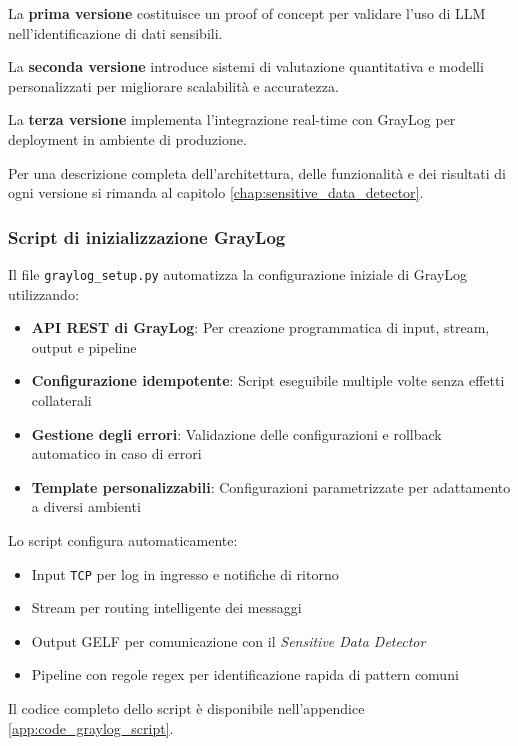 \documentclass[12pt]{report}
\begin{document}
La \textbf{prima versione} costituisce un proof of concept per validare l'uso di LLM nell'identificazione di dati sensibili.

La \textbf{seconda versione} introduce sistemi di valutazione quantitativa e modelli personalizzati per migliorare scalabilità e accuratezza.

La \textbf{terza versione} implementa l'integrazione real-time con GrayLog per deployment in ambiente di produzione.

Per una descrizione completa dell'architettura, delle funzionalità e dei risultati di ogni versione si rimanda al capitolo \ref{chap:sensitive_data_detector}.

\subsubsection{Script di inizializzazione GrayLog}
Il file \texttt{graylog\_setup.py} automatizza la configurazione iniziale di GrayLog utilizzando:

\begin{itemize}
    \item \textbf{API REST di GrayLog}: Per creazione programmatica di input, stream, output e pipeline
    \item \textbf{Configurazione idempotente}: Script eseguibile multiple volte senza effetti collaterali
    \item \textbf{Gestione degli errori}: Validazione delle configurazioni e rollback automatico in caso di errori
    \item \textbf{Template personalizzabili}: Configurazioni parametrizzate per adattamento a diversi ambienti
\end{itemize}

Lo script configura automaticamente:
\begin{itemize}
    \item Input \texttt{TCP} per log in ingresso e notifiche di ritorno
    \item Stream per routing intelligente dei messaggi
    \item Output GELF per comunicazione con il \textit{Sensitive Data Detector}
    \item Pipeline con regole regex per identificazione rapida di pattern comuni
\end{itemize}

Il codice completo dello script è disponibile nell'appendice \ref{app:code_graylog_script}.
\end{document}

